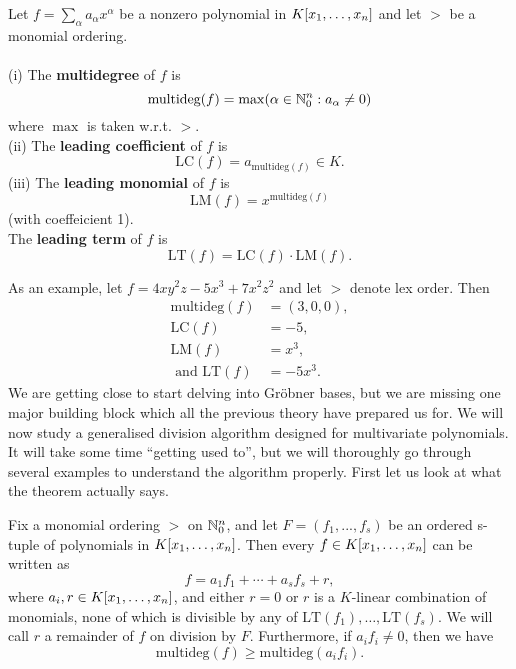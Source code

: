 \documentclass[english,bachelor]{liumaiex}
\begin{document}
\begin{define}
Let $f=\sum_{\alpha}a_\alpha x^\alpha$ be a nonzero polynomial in $K[x_1,\dots, x_n]$ and let $>$ be a monomial ordering.\\ \\
(i) The \textbf{multidegree} of $f$ is
\begin{displaymath}
\textrm{multideg}(f)=\max(\alpha\in\mathbb{N}_{0}^n : a_\alpha\neq0)
\end{displaymath}
where $\max$ is taken w.r.t. $>$.\\
(ii) The \textbf{leading coefficient} of $f$ is
\begin{displaymath}
\textrm{LC}(f)=a_{\textrm{multideg}(f)}\in K.
\end{displaymath}
(iii) The \textbf{leading monomial} of $f$ is
\begin{displaymath}
\textrm{LM}(f)=x^{\textrm{multideg}(f)}
\end{displaymath}
(with coeffeicient 1).\\
The \textbf{leading term} of $f$ is
\begin{displaymath}
\textrm{LT}(f)=\textrm{LC}(f)\cdot\textrm{LM}(f).
\end{displaymath}
\end{define}
As an example, let $f=4xy^2z-5x^3+7x^2z^2$ and let $>$ denote lex order. Then
\begin{align*}
\textrm{multideg}(f)&=(3,0,0),\\
\textrm{LC}(f)&=-5,\\
\textrm{LM}(f)&=x^3,\\
 \textrm{ and LT}(f)&=-5x^3.
\end{align*}
We are getting close to start delving into Gröbner bases, but we are missing one major building block which all the previous theory have prepared us for. We will now study a generalised division algorithm designed for multivariate polynomials. It will take some time ``getting used to'', but we will thoroughly go through several examples to understand the algorithm properly. First let us look at what the theorem actually says.
\begin{thm}
Fix a monomial ordering $>$ on $\mathbb{N}_{0}^n$, and let $F=(f_1,...,f_s)$ be an ordered s-tuple of polynomials in $K[x_1,\dots, x_n]$. Then every $f\in K[x_1,\dots, x_n]$ can be written as
\begin{displaymath}
f=a_1f_1+\cdots+a_sf_s+r,
\end{displaymath}
where $a_i,r\in K[x_1,\dots, x_n]$, and either $r=0$ or $r$ is a $K$-linear combination of monomials, none of which is divisible by any of $\textrm{LT}(f_1),\dots,\textrm{LT}(f_s).$ We will call $r$ a remainder of $f$ on division by $F$. Furthermore, if $a_if_i\neq0$, then we have
\begin{displaymath}
\textrm{multideg}(f)\geq\textrm{multideg}(a_if_i).
\end{displaymath}
\end{thm}
\end{document}
